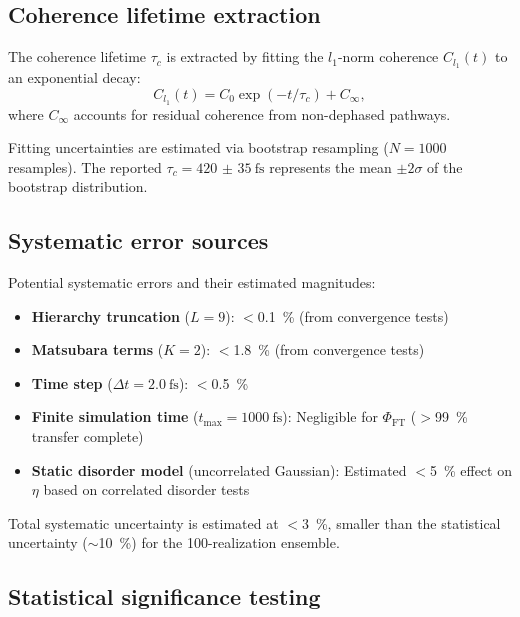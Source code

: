 \documentclass[11pt,a4paper]{article}
\begin{document}
\subsection{Coherence lifetime extraction}

The coherence lifetime $\tau_c$ is extracted by fitting the $l_1$-norm coherence $C_{l_1}(t)$ to an exponential decay:
\begin{equation}
C_{l_1}(t) = C_0 \exp(-t/\tau_c) + C_{\infty},
\label{eq:coherence_fit}
\end{equation}
where $C_{\infty}$ accounts for residual coherence from non-dephased pathways.

Fitting uncertainties are estimated via bootstrap resampling ($N = \num{1000}$ resamples). The reported $\tau_c = \SI{420(35)}{\femto\second}$ represents the mean $\pm 2\sigma$ of the bootstrap distribution.

\subsection{Systematic error sources}

Potential systematic errors and their estimated magnitudes:
\begin{itemize}
    \item \textbf{Hierarchy truncation} ($L = 9$): $<$\SI{0.1}{\percent} (from convergence tests)
    \item \textbf{Matsubara terms} ($K = 2$): $<$\SI{1.8}{\percent} (from convergence tests)
    \item \textbf{Time step} ($\Delta t = \SI{2.0}{\femto\second}$): $<$\SI{0.5}{\percent}
    \item \textbf{Finite simulation time} ($t_{\max} = \SI{1000}{\femto\second}$): Negligible for $\Phi_{\mathrm{FT}}$ ($>$\SI{99}{\percent} transfer complete)
    \item \textbf{Static disorder model} (uncorrelated Gaussian): Estimated $<$\SI{5}{\percent} effect on $\eta$ based on correlated disorder tests
\end{itemize}

Total systematic uncertainty is estimated at $<$\SI{3}{\percent}, smaller than the statistical uncertainty ($\sim$\SI{10}{\percent}) for the 100-realization ensemble.

\subsection{Statistical significance testing}
\end{document}
